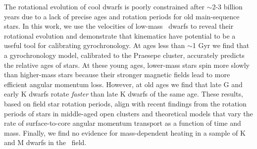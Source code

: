 
The rotational evolution of cool dwarfs is poorly constrained after $\sim$2-3
billion years due to a lack of precise ages and rotation periods for old
main-sequence stars.
In this work, we use the velocities of low-mass \kepler\ dwarfs to reveal
their rotational evolution and demonstrate that kinematics have potential to
be a useful tool for calibrating gyrochronology.
At ages less than $\sim$1 Gyr we find that a gyrochronology model, calibrated
to the Praesepe cluster, accurately predicts the relative ages of stars.
At these young ages, lower-mass stars spin more slowly than higher-mass stars
because their stronger magnetic fields lead to more efficient angular momentum
loss.
However, at old ages we find that late G and early K dwarfs rotate {\it
faster} than late K dwarfs of the same age.
These results, based on field star rotation periods, align with recent
findings from the rotation periods of stars in middle-aged open clusters and
theoretical models that vary the rate of surface-to-core angular momentum
transport as a function of time and mass.
Finally, we find no evidence for mass-dependent heating in a sample of K and M
dwarfs in the \kepler\ field.

